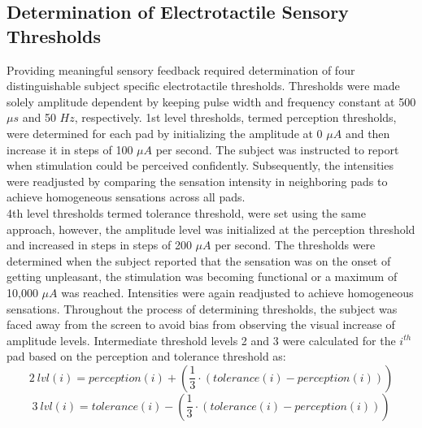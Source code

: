 
\subsection{Determination of Electrotactile Sensory Thresholds}


Providing meaningful sensory feedback required determination of four distinguishable subject specific electrotactile thresholds. Thresholds were made solely amplitude dependent by keeping pulse width and frequency constant at 500 $\mu s$ and 50 $Hz$, respectively. 1st level thresholds, termed perception thresholds, were determined for each pad by initializing the amplitude at 0 $\mu A$ and then increase it in steps of 100 $\mu A$ per second. The subject was instructed to report when stimulation could be perceived confidently. Subsequently, the intensities were readjusted by comparing the sensation intensity in neighboring pads to achieve homogeneous sensations across all pads. \\
4th level thresholds termed tolerance threshold, were set using the same approach, however, the amplitude level was initialized at the perception threshold and increased in steps in steps of 200 $\mu A$ per second. The thresholds were determined when the subject reported that the sensation was on the onset of getting unpleasant, the stimulation was becoming functional or a maximum of 10,000 $\mu A$ was reached. Intensities were again readjusted to achieve homogeneous sensations. Throughout the process of determining thresholds, the subject was faced away from the screen to avoid bias from observing the visual increase of amplitude levels. Intermediate threshold levels 2 and 3 were calculated for the $i^{th}$ pad based on the perception and tolerance threshold as: 
\vspace{-0.2cm}
{\small 
	\begin{equation}
	2~lvl(i) = perception(i) + (\frac{1}{3} \cdot (tolerance(i) - perception(i)))
	\end{equation}}
{\small
	\begin{equation}
	3~lvl(i) = tolerance(i) - (\frac{1}{3} \cdot (tolerance(i) - perception(i)))
	\end{equation}
}